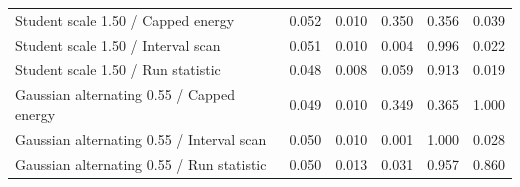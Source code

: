 \documentclass[11pt]{article}
\theoremstyle{definition}
\theoremstyle{remark}
\newcommand{\1}{\mathbf 1}
\begin{document}
\begin{table}[htbp]
{\begin{tabular}{lrrrrr}
Student scale 1.50 / Capped energy & 0.052 & 0.010 & 0.350 & 0.356 & 0.039 \\
Student scale 1.50 / Interval scan & 0.051 & 0.010 & 0.004 & 0.996 & 0.022 \\
Student scale 1.50 / Run statistic & 0.048 & 0.008 & 0.059 & 0.913 & 0.019 \\
Gaussian alternating 0.55 / Capped energy & 0.049 & 0.010 & 0.349 & 0.365 & 1.000 \\
Gaussian alternating 0.55 / Interval scan & 0.050 & 0.010 & 0.001 & 1.000 & 0.028 \\
Gaussian alternating 0.55 / Run statistic & 0.050 & 0.013 & 0.031 & 0.957 & 0.860 \\
\bottomrule
\end{tabular}
}
\end{table}
\end{document}
